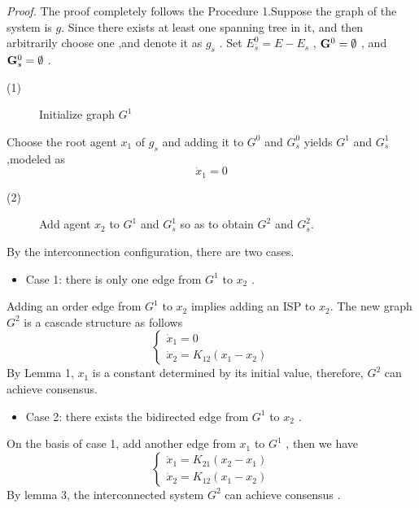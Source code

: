 \documentclass[english]{cccconf}
\begin{document}
{{\emph{{Proof.}} The proof completely follows the Procedure 1.Suppose the graph of the system is $g$.
Since there exists at least one spanning tree in it, and then arbitrarily choose one ,and
denote it as $g_s$ . Set $E_{\bar s}^0 = E - {E_s}$ , ${{\bf{G}}^0} = \emptyset $ , and ${\bf{G}}_s^0 = \emptyset $ .

\begin{description}
  \item[(1)] Initialize graph $G_{}^1$
  \end{description}

Choose the root agent  $x_1$  of $g_s$ and adding it to $G^0$ and $G_{s}^0$  yields $G_{}^1$  and $G_{s}^1$ ,modeled as
\begin{equation} \label{15}
\dot x_1 = 0
\end{equation}

\begin{description}
  \item[(2)] Add agent $x_2$ to $G_{}^1$  and $G_{s}^1$  so as to obtain  $G_{}^2$  and $G_{s}^2$.
  \end{description}
  By  the interconnection configuration, there are two cases.
\begin{itemize}
  \item Case 1:  there is only  one edge from  $G_{}^1$ to $x_2$ .
\end{itemize}

Adding an order edge from  $G_{}^1$ to $x_2$ implies adding an ISP to $x_2$. The new graph $G_{}^2$ is a cascade structure as follows
\[\left\{ \begin{array}{l}
{{\dot x}_1} = 0\\
{{\dot x}_2} = {K_{12}}({x_1} - {x_2})
\end{array} \right.\]
By Lemma 1,  $x_1$ is a constant determined by its initial value, therefore,  $G_{}^2$ can achieve consensus.
\begin{itemize}
  \item Case 2:  there exists the  bidirected edge from   $G_{}^1$ to $x_2$ .
\end{itemize}
On the basis of case 1, add  another edge from  $x_1$ to $G_{}^1$   , then  we have
\[\left\{ \begin{array}{l}
{{\dot x}_1} = {K_{21}}({x_2} - {x_1})\\
{{\dot x}_2} = {K_{12}}({x_1} - {x_2})
\end{array} \right.\]
By lemma 3, the interconnected system $G^2$ can achieve consensus .

}}
\end{document}
